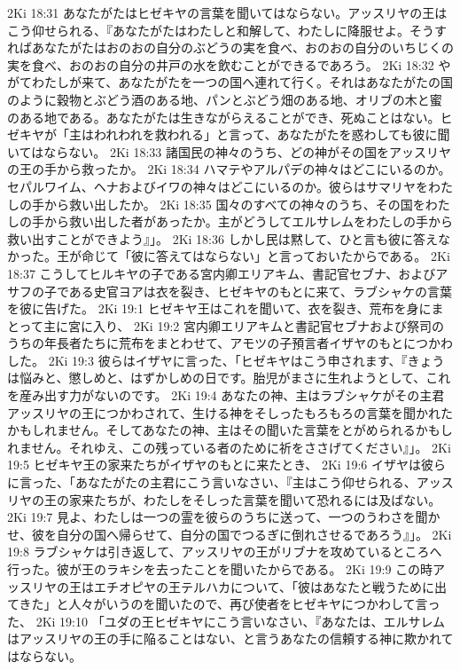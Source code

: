 2Ki 18:31  あなたがたはヒゼキヤの言葉を聞いてはならない。アッスリヤの王はこう仰せられる、『あなたがたはわたしと和解して、わたしに降服せよ。そうすればあなたがたはおのおの自分のぶどうの実を食べ、おのおの自分のいちじくの実を食べ、おのおの自分の井戸の水を飲むことができるであろう。
2Ki 18:32  やがてわたしが来て、あなたがたを一つの国へ連れて行く。それはあなたがたの国のように穀物とぶどう酒のある地、パンとぶどう畑のある地、オリブの木と蜜のある地である。あなたがたは生きながらえることができ、死ぬことはない。ヒゼキヤが「主はわれわれを救われる」と言って、あなたがたを惑わしても彼に聞いてはならない。
2Ki 18:33  諸国民の神々のうち、どの神がその国をアッスリヤの王の手から救ったか。
2Ki 18:34  ハマテやアルパデの神々はどこにいるのか。セパルワイム、ヘナおよびイワの神々はどこにいるのか。彼らはサマリヤをわたしの手から救い出したか。
2Ki 18:35  国々のすべての神々のうち、その国をわたしの手から救い出した者があったか。主がどうしてエルサレムをわたしの手から救い出すことができよう』」。
2Ki 18:36  しかし民は黙して、ひと言も彼に答えなかった。王が命じて「彼に答えてはならない」と言っておいたからである。
2Ki 18:37  こうしてヒルキヤの子である宮内卿エリアキム、書記官セブナ、およびアサフの子である史官ヨアは衣を裂き、ヒゼキヤのもとに来て、ラブシャケの言葉を彼に告げた。
2Ki 19:1  ヒゼキヤ王はこれを聞いて、衣を裂き、荒布を身にまとって主に宮に入り、
2Ki 19:2  宮内卿エリアキムと書記官セブナおよび祭司のうちの年長者たちに荒布をまとわせて、アモツの子預言者イザヤのもとにつかわした。
2Ki 19:3  彼らはイザヤに言った、「ヒゼキヤはこう申されます、『きょうは悩みと、懲しめと、はずかしめの日です。胎児がまさに生れようとして、これを産み出す力がないのです。
2Ki 19:4  あなたの神、主はラブシャケがその主君アッスリヤの王につかわされて、生ける神をそしったもろもろの言葉を聞かれたかもしれません。そしてあなたの神、主はその聞いた言葉をとがめられるかもしれません。それゆえ、この残っている者のために祈をささげてください』」。
2Ki 19:5  ヒゼキヤ王の家来たちがイザヤのもとに来たとき、
2Ki 19:6  イザヤは彼らに言った、「あなたがたの主君にこう言いなさい、『主はこう仰せられる、アッスリヤの王の家来たちが、わたしをそしった言葉を聞いて恐れるには及ばない。
2Ki 19:7  見よ、わたしは一つの霊を彼らのうちに送って、一つのうわさを聞かせ、彼を自分の国へ帰らせて、自分の国でつるぎに倒れさせるであろう』」。
2Ki 19:8  ラブシャケは引き返して、アッスリヤの王がリブナを攻めているところへ行った。彼が王のラキシを去ったことを聞いたからである。
2Ki 19:9  この時アッスリヤの王はエチオピヤの王テルハカについて、「彼はあなたと戦うために出てきた」と人々がいうのを聞いたので、再び使者をヒゼキヤにつかわして言った、
2Ki 19:10  「ユダの王ヒゼキヤにこう言いなさい、『あなたは、エルサレムはアッスリヤの王の手に陥ることはない、と言うあなたの信頼する神に欺かれてはならない。

